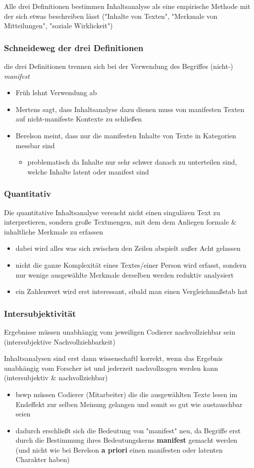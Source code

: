 \documentclass[11pt]{article}
\begin{document}
Alle drei Definitionen bestimmen Inhaltsanalyse als eine empirische Methode mit der sich etwas beschreiben lässt ("Inhalte von Texten", "Merkmale von Mitteilungen", "soziale Wirklickeit")
\subsubsection{Schneideweg der drei Definitionen}
\label{sec:orga014a60}
die drei Definitionen trennen sich bei der Verwendung des Begriffes (nicht-) \emph{manifest}
\begin{itemize}
\item Früh lehnt Verwendung ab
\item Mertens sagt, dass Inhaltsanalyse dazu dienen muss von manifesten Texten auf nicht-manifeste Kontexte zu schließen
\item Berelson meint, dass nur die manifesten Inhalte von Texte in Kategorien messbar sind
\begin{itemize}
\item problematisch da Inhalte nur sehr schwer danach zu unterteilen sind, welche Inhalte latent oder manifest sind
\end{itemize}
\end{itemize}
\subsubsection{Quantitativ}
\label{sec:orgd6618ab}
Die quantitative Inhaltsanalyse versucht nicht einen singulären Text zu interpretieren, sondern große Textmengen, mit dem dem Anliegen formale \& inhaltliche Merkmale zu erfassen
\begin{itemize}
\item dabei wird alles was sich zwischen den Zeilen abspielt außer Acht gelassen
\item nicht die ganze Komplexität eines Textes/einer Person wird erfasst, sondern nur wenige ausgewählte Merkmale derselben werden reduktiv analysiert
\item ein Zahlenwert wird erst interessant, sibald man einen Vergleichmaßstab hat
\end{itemize}
\subsubsection{Intersubjektivität}
\label{sec:org0f3172f}
Ergebnisse müssen unabhängig vom jeweiligen Codierer nachvollziehbar sein (intersubjektive Nachvollziehbarkeit)

Inhaltsanalysen sind erst dann wissenschaftl korrekt, wenn das Ergebnis unabhängig vom Forscher ist und jederzeit nachvollzogen werden kann (intersubjektiv \& nachvollziehbar)
\begin{itemize}
\item bswp müssen Codierer (Mitarbeiter) die die ausgewählten Texte lesen im Endeffekt zur selben Meinung gelangen und somit so gut wie austauschbar seien
\item dadurch erschließt sich die Bedeutung von "manifest" neu, da Begriffe erst durch die Bestimmung ihres Bedeutungskerns \textbf{manifest} gemacht werden (und nicht wie bei Berelson \textbf{a priori} einen manifesten oder latenten Charakter haben)
\end{itemize}
\end{document}
